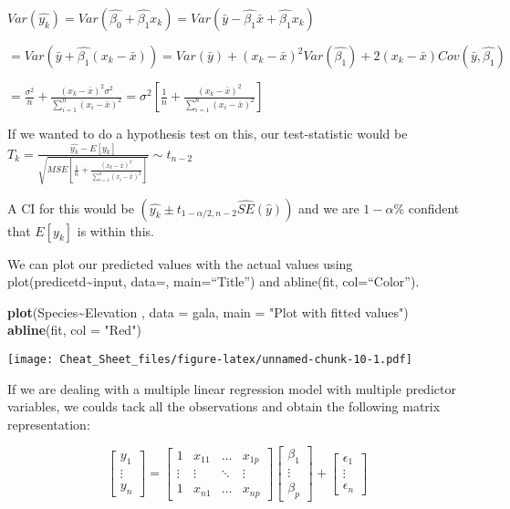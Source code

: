 \documentclass[
]{article}
\newenvironment{Shaded}{\begin{snugshade}}{\end{snugshade}}
\newcommand{\AttributeTok}[1]{\textcolor[rgb]{0.13,0.29,0.53}{#1}}
\newcommand{\FunctionTok}[1]{\textcolor[rgb]{0.13,0.29,0.53}{\textbf{#1}}}
\newcommand{\NormalTok}[1]{#1}
\newcommand{\SpecialCharTok}[1]{\textcolor[rgb]{0.81,0.36,0.00}{\textbf{#1}}}
\newcommand{\StringTok}[1]{\textcolor[rgb]{0.31,0.60,0.02}{#1}}
\begin{document}
\(Var(\hat{y_k})=Var(\hat{\beta_0}+\hat{\beta_1}x_k)=Var(\bar{y}-\hat{\beta_1}\bar{x}+\hat{\beta_1}x_k)\)

\(=Var(\bar{y}+\hat{\beta_1}(x_k-\bar{x}))=Var(\bar{y})+(x_k-\bar{x})^2Var(\hat{\beta_1})+2(x_k-\bar{x})Cov(\bar{y},\hat{\beta_1})\)

\(=\frac{\sigma^2}{n}+\frac{(x_k-\bar{x})^2\sigma^2}{\sum_{i=1}^n(x_i-\bar{x})^2}=\sigma^2[\frac{1}{n}+\frac{(x_k-\bar{x})^2}{\sum_{i=1}^n(x_i-\bar{x})^2}]\)

If we wanted to do a hypothesis test on this, our test-statistic would
be
\(T_k=\frac{\hat{y_k}-E[y_k]}{\sqrt{MSE[\frac{1}{n}+\frac{(x_k-\bar{x})^2}{\sum_{i=1}^n(x_i-\bar{x})^2}]}} \sim t_{n-2}\)

A CI for this would be
\((\hat{y_k} \pm t_{1-\alpha/2,n-2}\hat{SE}(\hat{y}))\) and we are
\(1-\alpha\)\% confident that \(E[y_k]\) is within this.

We can plot our predicted values with the actual values using
plot(predicetd\textasciitilde input, data=, main=``Title'') and
abline(fit, col=``Color'').

\begin{Shaded}
\begin{Highlighting}[]
\FunctionTok{plot}\NormalTok{(Species}\SpecialCharTok{\textasciitilde{}}\NormalTok{Elevation , }\AttributeTok{data =}\NormalTok{ gala,}
     \AttributeTok{main =} \StringTok{"Plot with fitted values"}\NormalTok{)}
\FunctionTok{abline}\NormalTok{(fit, }\AttributeTok{col =} \StringTok{"Red"}\NormalTok{)}
\end{Highlighting}
\end{Shaded}

\texttt{[image: Cheat\_Sheet\_files/figure-latex/unnamed-chunk-10-1.pdf]}

If we are dealing with a multiple linear regression model with multiple
predictor variables, we coulds tack all the observations and obtain the
following matrix representation:

\[\begin{bmatrix}
y_1\\
\vdots\\
y_n
\end{bmatrix}
=\begin{bmatrix}
1 & x_{11} & \dots & x_{1p}\\
\vdots & \vdots & \ddots & \vdots\\
1 & x_{n1} & \dots & x_{np}
\end{bmatrix}\begin{bmatrix}
\beta_1\\
\vdots\\
\beta_p
\end{bmatrix} + \begin{bmatrix}
\epsilon_1\\
\vdots\\
\epsilon_n
\end{bmatrix}\]
\end{document}
